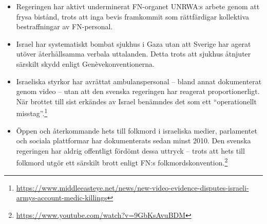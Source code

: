 \begin{itemize}
    \item Regeringen har aktivt underminerat FN-organet UNRWA:s arbete genom att frysa bistånd, trots att inga bevis framkommit som rättfärdigar kollektiva bestraffningar av FN-personal.
    
    \item Israel har systematiskt bombat sjukhus i Gaza utan att Sverige har agerat utöver återhållsamma verbala uttalanden. Detta trots att sjukhus åtnjuter särskilt skydd enligt Genèvekonventionerna.
    
    \item Israeliska styrkor har avrättat ambulanspersonal – bland annat dokumenterat genom video – utan att den svenska regeringen har reagerat proportionerligt. När brottet till sist erkändes av Israel benämndes det som ett \enquote{operationellt misstag}.\footnote{\url{https://www.middleeasteye.net/news/new-video-evidence-disputes-israeli-armys-account-medic-killings}}
    
    \item Öppen och återkommande hets till folkmord i israeliska medier, parlamentet och sociala plattformar har dokumenterats sedan minst 2010. Den svenska regeringen har aldrig offentligt fördömt dessa uttryck – trots att hets till folkmord utgör ett särskilt brott enligt FN:s folkmordskonvention.\footnote{\url{https://www.youtube.com/watch?v=9GbKsAvuBDM}}
\end{itemize}

